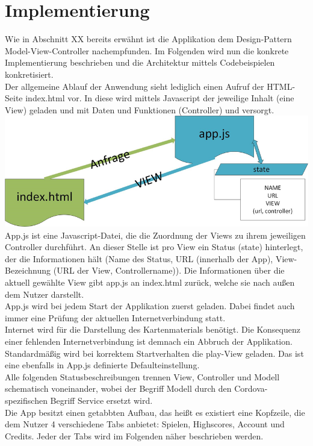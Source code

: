\newpage
\section{Implementierung}
Wie in Abschnitt XX bereits erwähnt ist die Applikation dem Design-Pattern Model-View-Controller nachempfunden. Im Folgenden wird nun die konkrete Implementierung beschrieben und die Architektur mittels Codebeispielen konkretisiert.
\\
Der allgemeine Ablauf der Anwendung sieht lediglich einen Aufruf der HTML-Seite index.html vor. In diese wird mittels Javascript der jeweilige Inhalt (eine View) geladen und mit Daten und Funktionen (Controller) und versorgt.
\\
\includegraphics[width=1\textwidth]{ref/images/index.png} \\ 
App.js ist eine Javascript-Datei, die die Zuordnung der Views zu ihrem jeweiligen Controller durchführt. An dieser Stelle ist pro View ein Status (state) hinterlegt, der die Informationen hält (Name des Status, URL (innerhalb der App), View-Bezeichnung (URL der View, Controllername)). Die Informationen über die aktuell gewählte View gibt app.js an index.html zurück, welche sie nach außen dem Nutzer darstellt.
\\
App.js wird bei jedem Start der Applikation zuerst geladen. Dabei findet auch immer eine Prüfung der aktuellen Internetverbindung statt.
\\
Internet wird für die Darstellung des Kartenmaterials benötigt. Die Konsequenz einer fehlenden Internetverbindung ist demnach ein Abbruch der Applikation.
\\
Standardmäßig wird bei korrektem Startverhalten die play-View geladen. Das ist eine ebenfalls in App.js definierte Defaulteinstellung.
\\
Alle folgenden Statusbeschreibungen trennen View, Controller und Modell schematisch voneinander, wobei der Begriff Modell durch den Cordova-spezifischen Begriff Service ersetzt wird.
\\
Die App besitzt einen getabbten Aufbau, das heißt es existiert eine Kopfzeile, die dem Nutzer 4 verschiedene Tabs anbietet: Spielen, Highscores, Account und Credits. Jeder der Tabs wird im Folgenden näher beschrieben werden.
